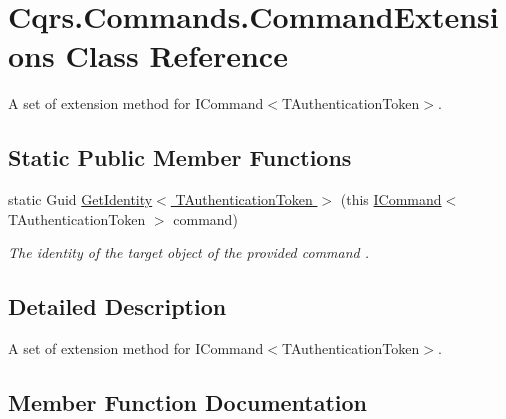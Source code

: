 \hypertarget{classCqrs_1_1Commands_1_1CommandExtensions}{}\section{Cqrs.\+Commands.\+Command\+Extensions Class Reference}
\label{classCqrs_1_1Commands_1_1CommandExtensions}


A set of extension method for I\+Command$<$\+T\+Authentication\+Token$>$.  


\subsection*{Static Public Member Functions}
\begin{DoxyCompactItemize}
\item 
static Guid \hyperlink{classCqrs_1_1Commands_1_1CommandExtensions_acdf4417cb00511a774b1012fd90dbeb7_acdf4417cb00511a774b1012fd90dbeb7}{Get\+Identity$<$ T\+Authentication\+Token $>$} (this \hyperlink{interfaceCqrs_1_1Commands_1_1ICommand}{I\+Command}$<$ T\+Authentication\+Token $>$ command)
\begin{DoxyCompactList}\small\item\em The identity of the target object of the provided {\itshape command} . \end{DoxyCompactList}\end{DoxyCompactItemize}


\subsection{Detailed Description}
A set of extension method for I\+Command$<$\+T\+Authentication\+Token$>$. 



\subsection{Member Function Documentation}
\mbox{\label{classCqrs_1_1Commands_1_1CommandExtensions_acdf4417cb00511a774b1012fd90dbeb7_acdf4417cb00511a774b1012fd90dbeb7}} 
